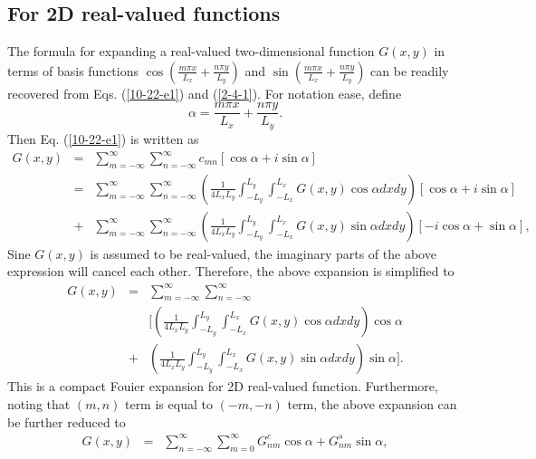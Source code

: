 \documentclass{article}
\newcommand{\nobracket}{}
\begin{document}
\subsection{For 2D real-valued functions}

The formula for expanding a real-valued two-dimensional function $G (x, y)$ in
terms of basis functions $\cos \left( \frac{m \pi x}{L_x} + \frac{n \pi
y}{L_y} \right)$ and $\sin \left( \frac{m \pi x}{L_x} + \frac{n \pi y}{L_y}
\right)$ can be readily recovered from Eqs. (\ref{10-22-e1}) and
(\ref{2-4-1}). For notation ease, define
\begin{equation}
  \alpha = \frac{m \pi x}{L_x} + \frac{n \pi y}{L_y} .
\end{equation}
Then Eq. (\ref{10-22-e1}) is written as
\begin{eqnarray*}
  G (x, y) & = & \sum_{m = - \infty}^{\infty} \sum_{n = - \infty}^{\infty}
  c_{m n} [\cos \alpha + i \sin \alpha]\\
  & = & \sum_{m = - \infty}^{\infty} \sum_{n = - \infty}^{\infty} \left(
  \frac{1}{4 L_x L_y} \int_{- L_y}^{L_y} \int_{- L_x}^{L_x} G (x, y) \cos
  \alpha d x d y \right)  [\cos \alpha + i \sin \alpha]\\
  & + & \sum_{m = - \infty}^{\infty} \sum_{n = - \infty}^{\infty} \left(
  \frac{1}{4 L_x L_y} \int_{- L_y}^{L_y} \int_{- L_x}^{L_x} G (x, y) \sin
  \alpha d x d y \right) [- i \cos \alpha + \sin \alpha],
\end{eqnarray*}
Sine $G (x, y)$ is assumed to be real-valued, the imaginary parts of the above
expression will cancel each other. Therefore, the above expansion is
simplified to
\begin{eqnarray}
  G (x, y) & = & \sum_{m = - \infty}^{\infty} \sum_{n = - \infty}^{\infty}
  \nonumber\\
  &  & [\nobracket \left( \frac{1}{4 L_x L_y} \int_{- L_y}^{L_y} \int_{-
  L_x}^{L_x} G (x, y) \cos \alpha d x d y \right) \cos \alpha \nonumber\\
  & + & \left( \frac{1}{4 L_x L_y} \int_{- L_y}^{L_y} \int_{- L_x}^{L_x} G
  (x, y) \sin \alpha d x d y \right) \sin \alpha \nobracket] . 
  \label{23-3-31-p1}
\end{eqnarray}
This is a compact Fouier expansion for 2D real-valued function. Furthermore,
noting that $(m, n)$ term is equal to $(- m, - n)$ term, the above expansion
can be further reduced to
\begin{eqnarray}
  G (x, y) & = & \sum_{n = - \infty}^{\infty} \sum_{m = 0}^{\infty} G_{n m}^c
  \cos \alpha + G^s_{n m} \sin \alpha,  \label{23-10-17-2}
\end{eqnarray}
\end{document}
